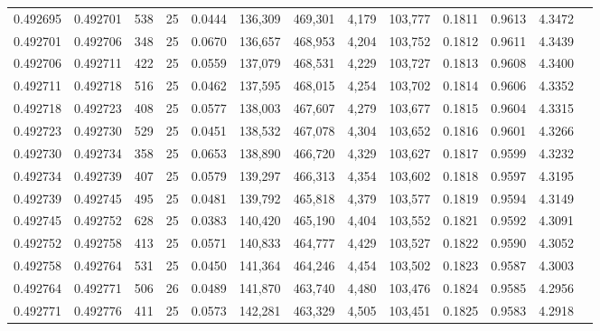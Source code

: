 \begin{tabular}{rrrrrrrrrrrrr}
0.492695 & 0.492701 &   538 &  25 &                                     0.0444 & 136,309 & 469,301 &   4,179 & 103,777 & 0.1811 & 0.9613 & 4.3472 \\
0.492701 & 0.492706 &   348 &  25 &                                     0.0670 & 136,657 & 468,953 &   4,204 & 103,752 & 0.1812 & 0.9611 & 4.3439 \\
0.492706 & 0.492711 &   422 &  25 &                                     0.0559 & 137,079 & 468,531 &   4,229 & 103,727 & 0.1813 & 0.9608 & 4.3400 \\
0.492711 & 0.492718 &   516 &  25 &                                     0.0462 & 137,595 & 468,015 &   4,254 & 103,702 & 0.1814 & 0.9606 & 4.3352 \\
0.492718 & 0.492723 &   408 &  25 &                                     0.0577 & 138,003 & 467,607 &   4,279 & 103,677 & 0.1815 & 0.9604 & 4.3315 \\
0.492723 & 0.492730 &   529 &  25 &                                     0.0451 & 138,532 & 467,078 &   4,304 & 103,652 & 0.1816 & 0.9601 & 4.3266 \\
0.492730 & 0.492734 &   358 &  25 &                                     0.0653 & 138,890 & 466,720 &   4,329 & 103,627 & 0.1817 & 0.9599 & 4.3232 \\
0.492734 & 0.492739 &   407 &  25 &                                     0.0579 & 139,297 & 466,313 &   4,354 & 103,602 & 0.1818 & 0.9597 & 4.3195 \\
0.492739 & 0.492745 &   495 &  25 &                                     0.0481 & 139,792 & 465,818 &   4,379 & 103,577 & 0.1819 & 0.9594 & 4.3149 \\
0.492745 & 0.492752 &   628 &  25 &                                     0.0383 & 140,420 & 465,190 &   4,404 & 103,552 & 0.1821 & 0.9592 & 4.3091 \\
0.492752 & 0.492758 &   413 &  25 &                                     0.0571 & 140,833 & 464,777 &   4,429 & 103,527 & 0.1822 & 0.9590 & 4.3052 \\
0.492758 & 0.492764 &   531 &  25 &                                     0.0450 & 141,364 & 464,246 &   4,454 & 103,502 & 0.1823 & 0.9587 & 4.3003 \\
0.492764 & 0.492771 &   506 &  26 &                                     0.0489 & 141,870 & 463,740 &   4,480 & 103,476 & 0.1824 & 0.9585 & 4.2956 \\
0.492771 & 0.492776 &   411 &  25 &                                     0.0573 & 142,281 & 463,329 &   4,505 & 103,451 & 0.1825 & 0.9583 & 4.2918 \\

\end{tabular}
